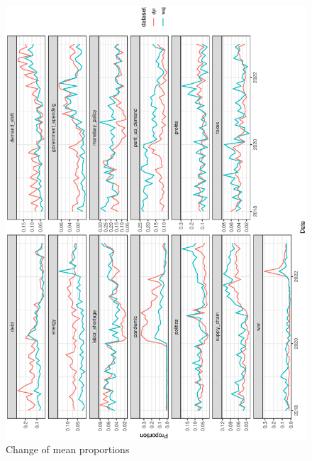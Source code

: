 \begin{figure}
	\centering
	\includegraphics[width=0.7\linewidth, angle = 270]{figures/comparision.eps}
	\caption{Change of mean proportions}
	\label{fig:comparision}
\end{figure}




\newpage




\newpage

\newpage





\newpage



\newpage



\newpage











